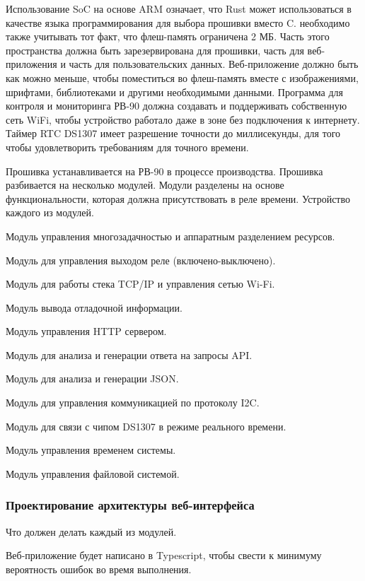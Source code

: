 Использование SoC на основе ARM означает, что Rust может использоваться в качестве языка программирования для выбора прошивки вместо C. необходимо также учитывать тот факт, что флеш-память ограничена 2 МБ. Часть этого пространства должна быть зарезервирована для прошивки, часть для веб-приложения и часть для пользовательских данных. Веб-приложение должно быть как можно меньше, чтобы поместиться во флеш-память вместе с изображениями, шрифтами, библиотеками и другими необходимыми данными. Программа для контроля и мониторинга РВ-90 должна создавать и поддерживать собственную сеть WiFi, чтобы устройство работало даже в зоне без подключения к интернету. Таймер RTC DS1307 имеет разрешение точности до миллисекунды, для того чтобы удовлетворить требованиям для точного времени.

Прошивка устанавливается на РВ-90 в процессе производства.  Прошивка разбивается на несколько модулей. Модули разделены на основе функциональности, которая должна присутствовать в реле времени. Устройство каждого из модулей.

\begin{my_itemize}
\item Модуль управления многозадачностью и аппаратным разделением ресурсов.
\item Модуль для управления выходом реле (включено-выключено).
\item Модуль для работы стека TCP/IP и управления сетью Wi-Fi.
\item Модуль вывода отладочной информации.
\item Модуль управления HTTP сервером.
\item Модуль для анализа и генерации ответа на запросы API.
\item Модуль для анализа и генерации JSON.
\item Модуль для управления коммуникацией по протоколу I2C.
\item Модуль для связи с чипом DS1307 в режиме реального времени.
\item Модуль управления временем системы.
\item Модуль управления файловой системой.
\end{my_itemize}

\subsubsection{ Проектирование архитектуры веб-интерфейса}
Что должен делать каждый из модулей.

Веб-приложение будет написано в Typescript, чтобы свести к минимуму вероятность ошибок во время выполнения.

